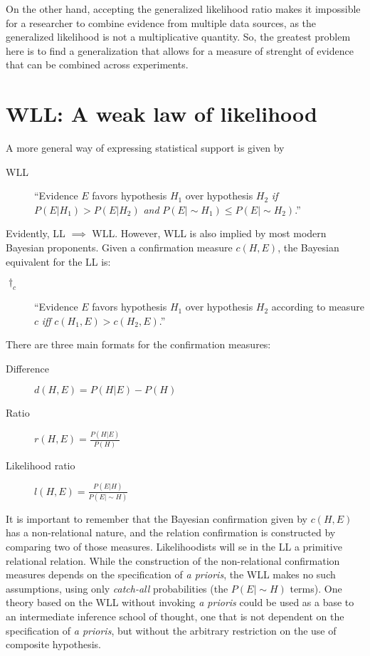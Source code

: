 \documentclass[twoside,12pt,a4paper]{article}
\begin{document}
On the other hand, accepting the generalized likelihood ratio makes it impossible for a researcher
to combine evidence from multiple data sources, as the generalized likelihood is not a multiplicative
quantity. So, the greatest problem here is to find a generalization that allows for a measure of
strenght of evidence that can be combined across experiments.

\section{WLL: A weak law of likelihood}

A more general way of expressing statistical support is given by 

\begin{description}
\item[WLL]
``Evidence $E$ favors hypothesis $H_1$ over hypothesis $H_2$ {\em if} $P(E|H_1) > P(E|H_2)$ {\em and}
$P(E|\sim\!\!H_1) \leq P(E|\sim\!\!H_2)$.''
\citep{Fitelson07}
\end{description}

Evidently, LL $\implies$ WLL. However, WLL is also implied by most modern Bayesian proponents. Given a 
confirmation measure $c(H,E)$, the Bayesian equivalent for the LL is:

\begin{description}
\item[$\dagger_c$]
``Evidence $E$ favors hypothesis $H_1$ over hypothesis $H_2$ according to measure $c$ {\em iff} $c(H_1,E) > c(H_2,E)$.''
\citep{Fitelson07}
\end{description}

There are three main formats for the confirmation measures:
\begin{description}
\item[Difference] $d(H,E) = P(H|E)-P(H)$
\item[Ratio] $r(H,E) = \frac{P(H|E)}{P(H)}$
\item[Likelihood ratio] $l(H,E) = \frac{P(E|H)}{P(E|\sim\!\!H)}$
\end{description}

It is important to remember that the Bayesian confirmation given by $c(H,E)$ has a non-relational nature,
and the relation confirmation is constructed by comparing two of those measures. Likelihoodists will se
in the LL a primitive relational relation. While the construction of the non-relational confirmation measures
depends on the specification of {\em a prioris}, the WLL makes no such assumptions, using only {\em catch-all}
probabilities (the $P(E|\sim\!\!H)$ terms). One theory based on the WLL without invoking {\em a prioris}
could be used as a base to an intermediate inference school of thought, one that is not dependent on the
specification of {\em a prioris}, but without the arbitrary restriction on the use of composite hypothesis.
\end{document}
